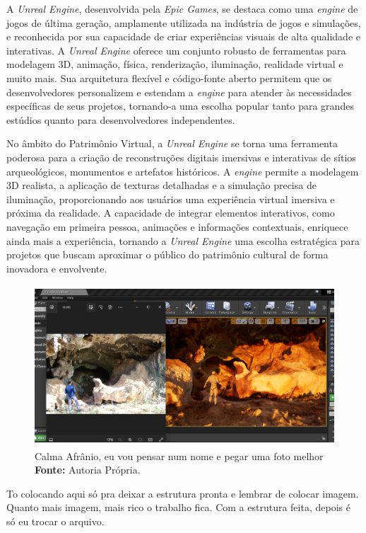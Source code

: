 A \textit{Unreal Engine}, desenvolvida pela\textit{ Epic Games}, se destaca como uma \textit{engine} de jogos de última geração, amplamente utilizada na indústria de jogos e simulações, e reconhecida por sua capacidade de criar experiências visuais de alta qualidade e interativas.  A \textit{Unreal Engine} oferece um conjunto robusto de ferramentas para modelagem 3D, animação, física, renderização, iluminação, realidade virtual e muito mais. Sua arquitetura flexível e código-fonte aberto permitem que os desenvolvedores personalizem e estendam a \textit{engine} para atender às necessidades específicas de seus projetos, tornando-a uma escolha popular tanto para grandes estúdios quanto para desenvolvedores independentes.

No âmbito do Patrimônio Virtual, a \textit{Unreal Engine} se torna uma ferramenta poderosa para a criação de reconstruções digitais imersivas e interativas de sítios arqueológicos, monumentos e artefatos históricos. A \textit{engine} permite a modelagem 3D realista, a aplicação de texturas detalhadas e a simulação precisa de iluminação, proporcionando aos usuários uma experiência virtual imersiva e próxima da realidade. A capacidade de integrar elementos interativos, como navegação em primeira pessoa, animações e informações contextuais, enriquece ainda mais a experiência, tornando a \textit{Unreal Engine} uma escolha estratégica para projetos que buscam aproximar o público do patrimônio cultural de forma inovadora e envolvente.
\begin{figure}[H]
    \centering
    \includegraphics[height=6cm, keepaspectratio]{img/unreal-print.png}
    \caption{Calma Afrânio, eu vou pensar num nome e pegar uma foto melhor \\
    \textbf{Fonte:} Autoria Própria.}
    \label{fig:unreal-print}
\end{figure}
To colocando aqui só pra deixar a estrutura pronta e lembrar de colocar imagem.
Quanto mais imagem, mais rico o trabalho fica. Com a estrutura feita, depois é só eu trocar o arquivo.
